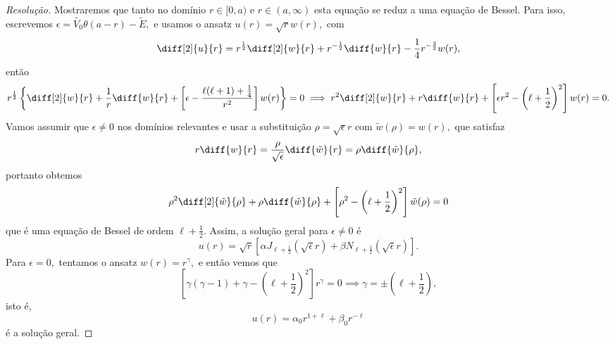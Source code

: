 \begin{proof}[Resolução]
    Mostraremos que tanto no domínio \(r \in [0,a)\) e \(r \in (a, \infty)\) esta equação se reduz a uma equação de Bessel. Para isso, escrevemos \(\epsilon = \tilde{V_0}\theta(a - r) - \tilde{E},\) e usamos o ansatz \(u(r) = \sqrt{r} w(r),\) com
    \begin{equation*}
        \diff[2]{u}{r} = r^{\frac12} \diff[2]{w}{r} + r^{-\frac12} \diff{w}{r} -\frac14 r^{-\frac32} w(r),
    \end{equation*}
    então
    \begin{equation*}
        r^{\frac12}\left\{\diff[2]{w}{r} + \frac{1}{r} \diff{w}{r} + \left[\epsilon - \frac{\ell(\ell+1) + \frac14}{r^2}\right] w(r)\right\} = 0 \implies r^2 \diff[2]{w}{r} + r \diff{w}{r} + \left[\epsilon r^2 - \left(\ell + \frac12\right)^2\right]w(r) = 0.
    \end{equation*}
    Vamos assumir que \(\epsilon \neq 0\) nos domínios relevantes e usar a substituição \(\rho = \sqrt{\epsilon} r\) com \(\tilde{w}(\rho) = w(r),\) que satisfaz
    \begin{equation*}
        r\diff{w}{r} =  \frac{\rho}{\sqrt{\epsilon}} \diff{\tilde{w}}{r} = \rho \diff{\tilde{w}}{\rho},
    \end{equation*}
    portanto obtemos
    \begin{equation*}
        \rho^2\diff[2]{\tilde{w}}{\rho} + \rho \diff{\tilde{w}}{\rho} + \left[\rho^2 - \left(\ell+\frac12\right)^2\right] \tilde{w}(\rho) = 0
    \end{equation*}
    que é uma equação de Bessel de ordem \(\ell + \frac12\). Assim, a solução geral para \(\epsilon \neq 0\) é
    \begin{equation*}
        u(r) = \sqrt{r} \left[\alpha J_{\ell + \frac12}(\sqrt{\epsilon} r) + \beta N_{\ell + \frac12}(\sqrt{\epsilon} r)\right].
    \end{equation*}
    Para \(\epsilon = 0,\) tentamos o ansatz \(w(r) = r^{\gamma},\) e então vemos que
    \begin{equation*}
        \left[\gamma(\gamma - 1) + \gamma - \left(\ell + \frac12\right)^2\right]r^{\gamma} = 0 \implies \gamma = \pm \left(\ell + \frac12\right),
    \end{equation*}
    isto é,
    \begin{equation*}
        u(r) = \alpha_0 r^{1 + \ell} + \beta_0 r^{-\ell}
    \end{equation*}
    é a solução geral.


\end{proof}
